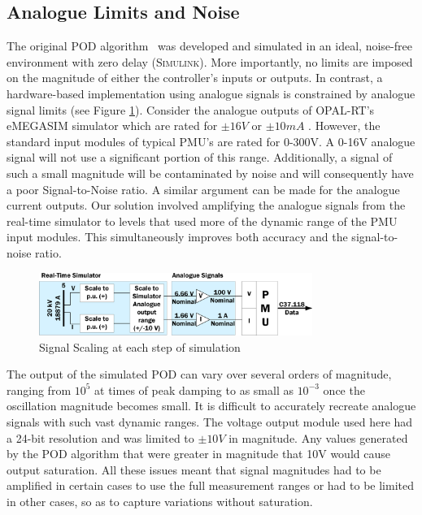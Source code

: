 \documentclass[journal]{IEEEtran}
\begin{document}


\subsection{Analogue Limits and Noise}
The original POD algorithm~\cite{PhasorPOD} was developed and simulated in an ideal, noise-free environment with zero delay (\textsc{Simulink}). More importantly, no limits are imposed on the magnitude of either the controller's inputs or outputs. In contrast, a hardware-based implementation using analogue signals is constrained by analogue signal limits (see Figure \ref{ScalingProblem}). Consider the analogue outputs of OPAL-RT's eMEGASIM simulator which are rated for $\pm16V$ or $\pm10mA$  \cite{eMEGASIM}.
However, the standard input modules of typical PMU's are rated for 0-300V. A 0-16V analogue signal will not use a significant portion of this range. Additionally, a signal of such a small magnitude will be contaminated by noise and will consequently have a poor Signal-to-Noise ratio. A similar argument can be made for the analogue current outputs. Our solution involved amplifying the analogue signals from the real-time simulator to levels that used more of the dynamic range of the PMU input modules. This simultaneously improves both accuracy and the signal-to-noise ratio.

\begin{figure}[tphb]
\centering
\includegraphics[width=3.5in]{Scaling.png}
\vspace{-1.3em}
\caption{Signal Scaling at each step of simulation}
\label{ScalingProblem}
\end{figure}
\vspace{-0.4em}
The output of the simulated POD can vary over several orders of magnitude, ranging from $10^{5}$ at times of peak damping to as small as $10^{-3}$ once the oscillation magnitude  becomes small. It is difficult to accurately recreate analogue signals with such vast dynamic ranges. The voltage output module used here had a 24-bit resolution and was limited to $\pm 10V$ in magnitude. Any values generated by the POD algorithm that were greater in magnitude that 10V would cause output saturation. All these issues meant that signal magnitudes had to be amplified in certain cases to use the full measurement ranges or had to be limited in other cases, so as to capture variations without saturation.
\end{document}
